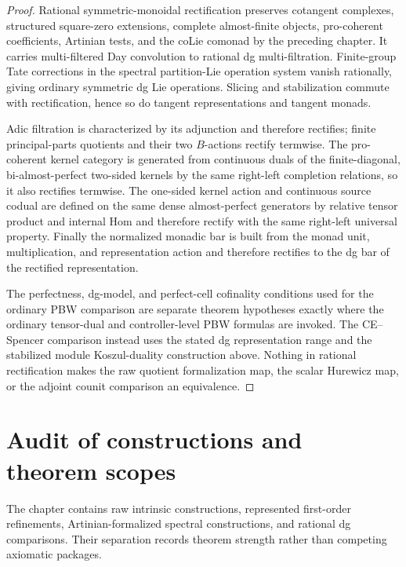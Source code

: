 \begin{proof}
Rational symmetric-monoidal rectification preserves cotangent complexes,
structured square-zero extensions, complete almost-finite objects,
pro-coherent coefficients, Artinian tests, and the coLie comonad by the
preceding chapter.  It carries multi-filtered Day convolution to rational dg
multi-filtration.  Finite-group Tate corrections in the spectral
partition-Lie operation system vanish rationally, giving ordinary symmetric
dg Lie operations.  Slicing and stabilization commute with rectification,
hence so do tangent representations and tangent monads.

Adic filtration is characterized by its adjunction and therefore rectifies;
finite principal-parts quotients and their two $B$-actions rectify termwise.
The pro-coherent kernel category is generated from continuous duals of the
finite-diagonal, bi-almost-perfect two-sided kernels by the same right-left
completion relations, so it also rectifies termwise.  The one-sided kernel
action and continuous source codual are defined on the same dense
almost-perfect generators by relative tensor product and internal Hom and
therefore rectify with the same right-left universal property.  Finally the
normalized monadic bar is built
from the monad unit, multiplication, and representation action and therefore
rectifies to the dg bar of the rectified representation.

The perfectness, dg-model, and perfect-cell cofinality conditions used for the
ordinary PBW comparison are separate theorem hypotheses exactly where the
ordinary tensor-dual and controller-level PBW formulas are invoked.  The
CE--Spencer comparison instead uses the stated dg representation range and
the stabilized module Koszul-duality construction above.  Nothing in
rational rectification makes the raw quotient formalization map, the scalar
Hurewicz map, or the adjoint counit comparison an equivalence.
\end{proof}

\section{Audit of constructions and theorem scopes}
\label{sec:as-audit}

The chapter contains raw intrinsic constructions, represented first-order
refinements, Artinian-formalized spectral constructions, and rational dg
comparisons.  Their separation records theorem strength rather than competing
axiomatic packages.

